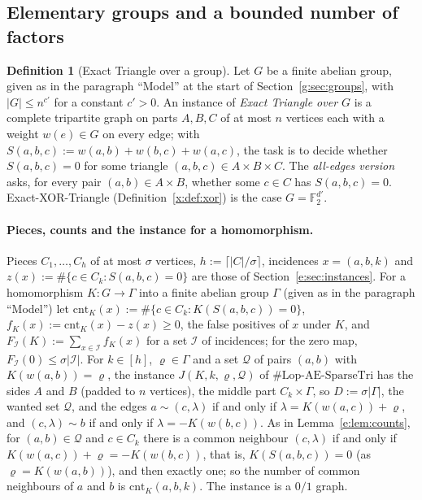 \documentclass[11pt]{article}
\theoremstyle{definition}
\newtheorem{definition}[theorem]{Definition}
\theoremstyle{remark}
\newcommand{\F}{\mathbb{F}_2}
\newcommand{\Lop}{\mathrm{Lop}\text{-}\allowbreak\mathrm{AE}\text{-}\allowbreak\mathrm{SparseTri}}
\newcommand{\cnt}{\mathrm{cnt}}
\newcommand{\Iq}{\mathcal{I}}
\begin{document}
\subsection{Elementary groups and a bounded number of factors}\label{g:sec:triangle:el}

\begin{definition}[Exact Triangle over a group]\label{g:def:triangle}
Let $G$ be a finite abelian group, given as in the paragraph ``Model'' at the start of Section~\ref{g:sec:groups}, with $|G|\le n^{c'}$ for a constant $c'>0$. An instance of \emph{Exact Triangle over $G$} is a complete tripartite graph on parts $A,B,C$ of at most $n$ vertices each with a weight $w(e)\in G$ on every edge; with $S(a,b,c):=w(a,b)+w(b,c)+w(a,c)$, the task is to decide whether $S(a,b,c)=0$ for some triangle $(a,b,c)\in A\times B\times C$. The \emph{all-edges version} asks, for every pair $(a,b)\in A\times B$, whether some $c\in C$ has $S(a,b,c)=0$. Exact-XOR-Triangle (Definition~\ref{x:def:xor}) is the case $G=\F^{d'}$.
\end{definition}

\paragraph{Pieces, counts and the instance for a homomorphism.} Pieces $C_1,\dots,C_h$ of at most $\sigma$ vertices, $h:=\lceil|C|/\sigma\rceil$, incidences $x=(a,b,k)$ and $z(x):=\#\{c\in C_k:S(a,b,c)=0\}$ are those of Section~\ref{e:sec:instances}. For a homomorphism $K\colon G\to\Gamma$ into a finite abelian group $\Gamma$ (given as in the paragraph ``Model'') let $\cnt_K(x):=\#\{c\in C_k:K(S(a,b,c))=0\}$, $f_K(x):=\cnt_K(x)-z(x)\ge0$, the false positives of $x$ under $K$, and $F_\Iq(K):=\sum_{x\in\Iq}f_K(x)$ for a set $\Iq$ of incidences; for the zero map, $F_\Iq(0)\le\sigma|\Iq|$. For $k\in[h]$, $\varrho\in\Gamma$ and a set $\mathcal Q$ of pairs $(a,b)$ with $K(w(a,b))=\varrho$, the instance $J(K,k,\varrho,\mathcal Q)$ of $\#\Lop$ has the sides $A$ and $B$ (padded to $n$ vertices), the middle part $C_k\times\Gamma$, so $D:=\sigma|\Gamma|$, the wanted set $\mathcal Q$, and the edges $a\sim(c,\lambda)$ if and only if $\lambda=K(w(a,c))+\varrho$, and $(c,\lambda)\sim b$ if and only if $\lambda=-K(w(b,c))$. As in Lemma~\ref{e:lem:counts}, for $(a,b)\in\mathcal Q$ and $c\in C_k$ there is a common neighbour $(c,\lambda)$ if and only if $K(w(a,c))+\varrho=-K(w(b,c))$, that is, $K(S(a,b,c))=0$ (as $\varrho=K(w(a,b))$), and then exactly one; so the number of common neighbours of $a$ and $b$ is $\cnt_K(a,b,k)$. The instance is a $0/1$ graph.
\end{document}
